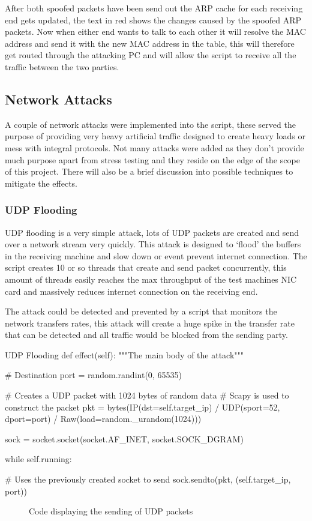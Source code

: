 After both spoofed packets have been send out the ARP cache for each receiving end gets updated, the text in red shows the changes caused by the spoofed ARP packets. Now when either end wants to talk to each other it will resolve the MAC address and send it with the new MAC address in the table, this will therefore get routed through the attacking PC and will allow the script to receive all the traffic between the two parties.

\subsection{Network Attacks}
A couple of network attacks were implemented into the script, these served the purpose of providing very heavy artificial traffic designed to create heavy loads or mess with integral protocols. Not many attacks were added as they don't provide much purpose apart from stress testing and they reside on the edge of the scope of this project. There will also be a brief discussion into possible techniques to mitigate the effects. 

\subsubsection{UDP Flooding}
UDP flooding is a very simple attack, lots of UDP packets are created and send over a network stream very quickly. This attack is designed to `flood' the buffers in the receiving machine and slow down or event prevent internet connection. The script creates 10 or so threads that create and send packet concurrently, this amount of threads easily reaches the max throughput of the test machines NIC card and massively reduces internet connection on the receiving end.

The attack could be detected and prevented by a script that monitors the network transfers rates, this attack will create a huge spike in the transfer rate that can be detected and all traffic would be blocked from the sending party.

\begin{Code}{UDP Flooding}
  def effect(self):
        """The main body of the attack"""

        # Destination
        port = random.randint(0, 65535)

        # Creates a UDP packet with 1024 bytes of random data
        # Scapy is used to construct the packet
        pkt = bytes(IP(dst=self.target_ip) / UDP(sport=52, dport=port) / 
        			Raw(load=random._urandom(1024)))

        sock = socket.socket(socket.AF_INET, socket.SOCK_DGRAM)

        while self.running:

            # Uses the previously created socket to send
            sock.sendto(pkt, (self.target_ip, port))
			
\end{Code}
\begin{figure}[h]
	\caption{Code displaying the sending of UDP packets}
	\label{ref:UdpFloodingFigure}
\end{figure}


